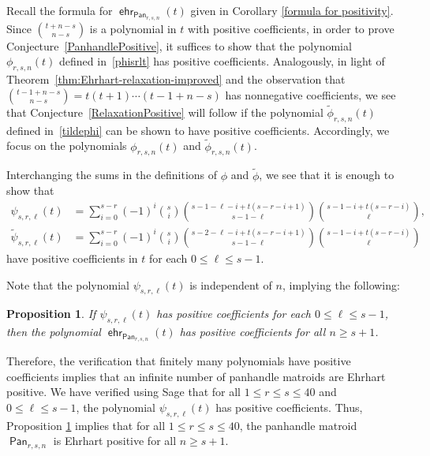 \documentclass[11pt]{amsart}
\newtheorem{proposition}[theorem]{Proposition}
\theoremstyle{definition}
\newcommand{\0}{\emptyset}
\DeclareMathOperator{\ehr}{\mathsf{ehr}}
\DeclareMathOperator{\Pan}{\mathsf{Pan}} %
\begin{document}
Recall the formula for $\ehr_{\Pan_{r,s,n}}(t)$ given in Corollary \ref{formula for positivity}.
Since $\binom{t+n-s}{n-s}$ is a polynomial in $t$ with positive coefficients, in order to prove Conjecture~\ref{PanhandlePositive}, it suffices to show that the polynomial $\phi_{r,s,n}(t)$ defined in~\eqref{phisrlt} has positive coefficients.
Analogously, in light of Theorem~\ref{thm:Ehrhart-relaxation-improved} and the observation that $\binom{t-1+n-s}{n-s}=t(t+1)\cdots(t-1+n-s)$ has nonnegative coefficients, we see that Conjecture~\ref{RelaxationPositive} will follow if the polynomial $\tilde\phi_{r,s,n}(t)$ defined in~\eqref{tildephi} can be shown to have positive coefficients.
Accordingly, we focus on the polynomials $\phi_{r,s,n}(t)$ and $\tilde\phi_{r,s,n}(t)$.

Interchanging the sums in the definitions of $\phi$ and $\tilde\phi$, we see that it is enough to show that
\begin{equation} \label{psisrlt}
\begin{aligned}
\psi_{s,r,\ell}(t) &=\sum_{i=0}^{s-r}(-1)^i\binom{s}{i}\binom{s-1-\ell-i+t(s-r-i+1)}{s-1-\ell}\binom{s-1-i+t(s-r-i)}{\ell},\\
\tilde{\psi}_{s,r,\ell}(t) &= \sum_{i=0}^{s-r}(-1)^i\binom{s}{i}\binom{s-2-\ell-i+t(s-r-i+1)}{s-1-\ell}\binom{s-1-i+t(s-r-i)}{\ell}
\end{aligned}
\end{equation}
have positive coefficients in $t$ for each $0\leq \ell\leq s-1$.


Note that the polynomial $\psi_{s,r,\ell}(t)$ is independent of $n$, implying the following: %

\begin{proposition}\label{prop:PanPosSmall s}
If $\psi_{s,r,\ell}(t)$ has positive coefficients for each $0\leq \ell\leq s-1$, then the polynomial $\ehr_{\Pan_{r,s,n}}(t)$ has positive coefficients for all $n\geq s+1$.
\end{proposition}

Therefore, the verification that finitely many polynomials have positive coefficients implies that an infinite number of panhandle matroids are Ehrhart positive.
We have verified using Sage that for all $1\leq r\leq s\leq 40$ and $0\leq \ell\leq s-1$, the polynomial $\psi_{s,r,\ell}(t)$ has positive coefficients. Thus, Proposition \ref{prop:PanPosSmall s} implies that for all $1\leq r\leq s\leq 40$, the panhandle matroid $\Pan_{r,s,n}$ is Ehrhart positive for all $n\geq s+1$.
\end{document}
